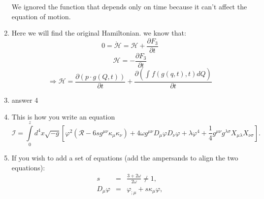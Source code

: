 \documentclass[11pt,fleqn]{article}
\begin{document}
\begin{enumerate}
We ignored the function that depends only on time because it can't affect the equation of motion.
\item Here we will find the original Hamiltonian.
\newline
we know that:
\begin{equation}
0=\grave{\mathcal{H}}=\mathcal{H}+\frac{\partial F_{3}}{\partial t}
\end{equation}
\begin{equation}
\mathcal{H}=-\frac{\partial F_{3}}{\partial t}
\end{equation}
\begin{equation}
\Rightarrow\boxed{\mathcal{H}=\frac{\partial (p\cdot g(Q,t))}{\partial t}+\frac{\partial (\int_{}^{}f(g(q,t),t)dQ)}{\partial t}}
\end{equation}
\item answer 4
\item This is how you write an equation
\begin{equation}
\mathcal{I} =\int \limits_0^z  d^4x \sqrt{-g}\left[\varphi^2\left(\mathcal{R}-6sg^{\mu \nu} \kappa_\mu \kappa_\nu\right) + 4 \omega g^{\mu \nu}D_\mu \varphi D_\nu \varphi + \lambda \varphi^4 + \frac{1}{4}g^{\mu \nu} g^{\lambda \sigma}X_{\mu \lambda}X_{\nu \sigma}\right].
\end{equation}

\item If you wish to add a set of equations (add the ampersands to align the two equations):
\begin{eqnarray}
 s &=& \frac{3+2\omega}{2\omega}\neq 1,\\
 D_\mu \varphi &=& \varphi_{;\mu} + s \kappa_\mu \varphi,
\end{eqnarray}


\end{enumerate}
\end{document}
